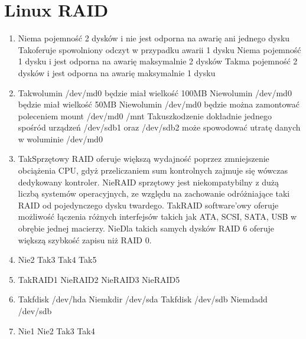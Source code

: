 
\newpage
\section{Linux RAID}
\begin{enumerate}
	\item {}%
	{Nie}{ma pojemność 2 dysków i nie jest odporna na awarię ani jednego dysku}%
	{Tak}{oferuje spowolniony odczyt w przypadku awarii 1 dysku}%
	{Nie}{ma pojemność 1 dysku i jest odporna na awarię maksymalnie 2 dysków}%
	{Tak}{ma pojemność 2 dysków i jest odporna na awarię maksymalnie 1 dysku}
	\item {}%
	{Tak}{wolumin /dev/md0 będzie miał wielkość 100MB}%
	{Nie}{wolumin /dev/md0 będzie miał wielkość 50MB}%
	{Nie}{wolumin /dev/md0 będzie można zamontować poleceniem mount /dev/md0 /mnt}%
	{Tak}{uszkodzenie dokładnie jednego spośród urządzeń /dev/sdb1 oraz /dev/sdb2 może spowodować utratę danych w woluminie /dev/md0}
	\item {}%
	{Tak}{Sprzętowy RAID oferuje większą wydajność poprzez zmniejszenie obciążenia CPU, gdyż przeliczaniem sum kontrolnych zajmuje się wówczas dedykowany kontroler.}%
	{Nie}{RAID sprzętowy jest niekompatybilny z dużą liczbą systemów operacyjnych, ze względu na zachowanie odróżniające taki RAID od pojedynczego dysku twardego.}%
	{Tak}{RAID software'owy oferuje możliwość łączenia różnych interfejsów takich jak ATA, SCSI, SATA, USB w obrębie jednej macierzy.}%
	{Nie}{Dla takich samych dysków RAID 6 oferuje większą szybkość zapisu niż RAID 0.}
	\item {}%
	{Nie}{2}%
	{Tak}{3}%
	{Tak}{4}%
	{Tak}{5}
	\item {}%
	{Tak}{RAID1}%
	{Nie}{RAID2}%
	{Nie}{RAID3}%
	{Nie}{RAID5}
	\item {}%
	{Tak}{fdisk /dev/hda}%
	{Nie}{mkdir /dev/sda}%
	{Tak}{fdisk /dev/sdb}%
	{Nie}{mdadd /dev/sdb}
	\item {}%
	{Nie}{1}%
	{Nie}{2}%
	{Tak}{3}%
	{Tak}{4}
	

\end{enumerate}
